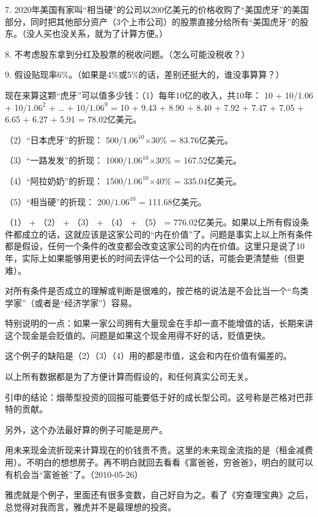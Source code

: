 7. 2020年美国有家叫“相当硬”的公司以200亿美元的价格收购了“美国虎牙”的美国部分，同时把其他部分资产（3个上市公司）的股票直接分给所有“美国虎牙”的股东。（没人买也没关系，就为了计算方便。）

8. 不考虑股东拿到分红及股票的税收问题。（怎么可能没税收？）

9. 假设贴现率6\%。（如果是4\%或5\%的话，差别还挺大的，谁没事算算？）

现在来算这颗“虎牙”可以值多少钱：（1）每年10亿的收入，共10年： 10 + 10/1.06 + 10/\(1.06^{2}\) + … + 10/\(1.06^{9}\) = 10 + 9.43 + 8.90 + 8.40 + 7.92 + 7.47 + 7.05 + 6.65 + 6.27 + 5.91 = 78.02亿美元。

（2）“日本虎牙”的折现： 500/\(1.06^{10}\)\(\times\)30\% = 83.76亿美元。

（3）“一路发发”的折现： 1000/\(1.06^{10}\)\(\times\)30\% = 167.52亿美元。

（4）“阿拉奶奶”的折现： 1500/\(1.06^{10}\)\(\times\)40\% = 335.04亿美元。

（5）“相当硬”的折现： 200/\(1.06^{10}\) = 111.68亿美元。

（1） + （2） + （3） + （4） + （5） = 776.02亿美元。如果以上所有假设条件都成立的话，这就应该是这家公司的“内在价值”了。问题是事实上以上所有条件都是假设，任何一个条件的改变都会改变这家公司的内在价值。这里只是说了10年，实际上如果能够用更长的时间去评估一个公司的话，可能会更清楚些（但更难）。

对所有条件是否成立的理解或判断是很难的，按芒格的说法是不会比当一个“鸟类学家”（或者是“经济学家”）容易。

特别说明的一点：如果一家公司拥有大量现金在手却一直不能增值的话，长期来讲这个现金是会贬值的。问题是如果这个现金用得不好的话，贬值更快。

这个例子的缺陷是（2）（3）（4）用的都是市值，这会和内在价值有偏差的。

以上所有数据都是为了方便计算而假设的，和任何真实公司无关。

引申的结论：烟蒂型投资的回报可能要低于好的成长型公司。这号称是芒格对巴菲特的贡献。

另外，这个办法最好算的例子可能是房产。

用未来现金流折现来计算现在的价钱贵不贵。这里的未来现金流指的是（租金减费用）。不明白的想想房子。再不明白就回去看看《富爸爸，穷爸爸》，明白的就可以有机会当“富爸爸”了。（2010-05-26）


雅虎就是个例子，里面还有很多变数，自己好自为之。看了《穷查理宝典》之后，总觉得对我而言，雅虎并不是最理想的投资。

